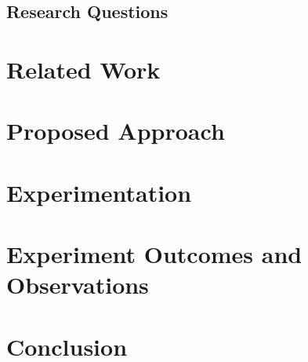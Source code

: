 \documentclass[conference]{IEEEtran}
\begin{document}
\subsection{Research Questions}

\section{Related Work}

\section{Proposed Approach}

\section{Experimentation}

\section{Experiment Outcomes and Observations}

\section{Conclusion}



\end{document}
